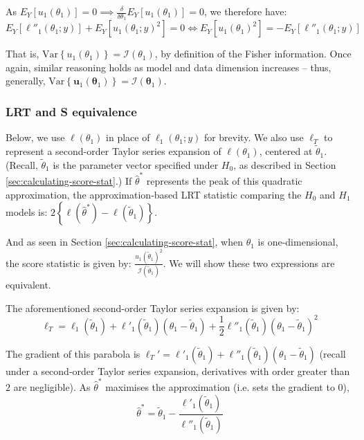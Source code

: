 \documentclass{article}
\newcommand{\thetaOne}{\boldsymbol{\theta}_1}
\newcommand{\thetaOneOD}{\theta_1}
\newcommand{\thetaOneTildeOD}{\tilde{\theta}_1} %
\newcommand{\scoreUOneDim}{u_1 (\thetaOneTildeOD)}
\newcommand{\lrbr}[1]{\left\{ #1 \right\}}
\newcommand{\llSimple}{\ell_1(\thetaOneOD; y)}
\newcommand{\llSimpleSecondDeriv}{\ell''_1(\thetaOneOD; y)}
\newcommand{\scoreSimple}{u_1(\thetaOneOD)}
\newcommand{\scoreSimpleCond}{u_1(\thetaOneOD; y)}
\newcommand{\deltaThetaOneOD}{\frac{\delta}{\delta \thetaOneOD}}
\newcommand{\ellT}{\ell_T}
\newcommand{\thetaHatStar}{\hat{\theta}^*}
\newcommand{\ellTilde}{\ell_1(\thetaOneTildeOD)}
\newcommand{\ellTildeFirstDeriv}{\ell'_1(\thetaOneTildeOD)}
\newcommand{\ellTildeSecondDeriv}{\ell''_1(\thetaOneTildeOD)}
\begin{document}
As $E_Y [\scoreSimple] = 0 \implies \deltaThetaOneOD
E_Y [\scoreSimple] = 0$, we therefore have:
\begin{equation*}
  E_Y[\llSimpleSecondDeriv] + E_Y[\scoreSimpleCond^2] = 0
  \iff E_Y[\scoreSimple^2] = -E_Y[\llSimpleSecondDeriv]
\end{equation*}

That is, $\text{Var}\lrbr{\scoreSimple} = \mathcal{I}(\thetaOneOD)$,
by definition of the Fisher information. Once again, similar
reasoning holds as model and data dimension increases -- thus,
generally, $\text{Var}\lrbr{\boldsymbol{u}_1 (\thetaOne)} =
\mathcal{I}(\thetaOne)$. 

\subsubsection*{LRT and S equivalence}
\label{sec:lrt-s-equiv-proof}

Below, we use $\ell(\thetaOneOD)$ in place of $\llSimple$ for
brevity. We also use $\ellT$ to represent a second-order Taylor series
expansion of $\ell(\thetaOneOD)$, centered at
$\thetaOneTildeOD$. (Recall, $\thetaOneTildeOD$ is the parameter vector
specified under $H_0$, as described in Section
\ref{sec:calculating-score-stat}.) If $\thetaHatStar$ represents the
peak of this quadratic approximation, the approximation-based LRT
statistic comparing the $H_0$ and $H_1$ models is:
$2\lrbr{\ell(\thetaHatStar) - \ell(\thetaOneTildeOD)}$. 

And as seen in Section \ref{sec:calculating-score-stat}, when
$\thetaOneOD$ is one-dimensional, the score statistic is given by:
$\frac{\scoreUOneDim^2}{\mathcal{I}(\thetaOneTildeOD)}$. We will show
these two expressions are equivalent.

The aforementioned second-order Taylor series expansion is
given by: 
\begin{equation}
  \label{eq:taylor-exp}
  \ellT = \ellTilde + \ellTildeFirstDeriv(\thetaOneOD -
  \thetaOneTildeOD) +  \frac{1}{2} \ellTildeSecondDeriv(\thetaOneOD -
  \thetaOneTildeOD)^2 
\end{equation}

The gradient of this parabola is $\ellT' = \ellTildeFirstDeriv +
\ellTildeSecondDeriv(\thetaOneOD - \thetaOneTildeOD)$ (recall under a
second-order Taylor series expansion, derivatives with
order greater than $2$ are negligible). As $\thetaHatStar$
maximises the approximation (i.e. sets the gradient to $0$),
\begin{equation}
  \label{eq:theta-hat-star}
  \thetaHatStar = \thetaOneTildeOD -
  \frac{\ellTildeFirstDeriv}{\ellTildeSecondDeriv}
\end{equation}
\end{document}
